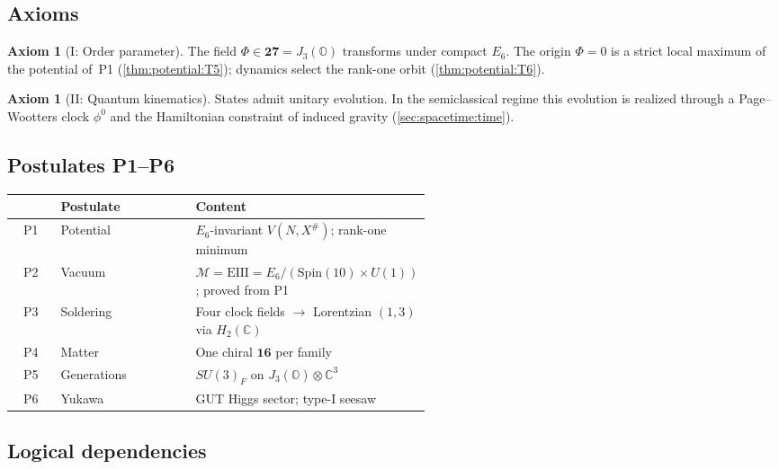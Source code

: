 \documentclass[11pt]{article}
\theoremstyle{plain}
\theoremstyle{definition}
\newtheorem{axiom}[theorem]{Axiom}
\theoremstyle{remark}
\newcommand{\clock}{\phi^{0}}
\begin{document}
\subsection{Axioms}
\label{sec:master:axioms}

\begin{axiom}[I: Order parameter]\label{ax:master:I}
The field $\Phi\in\mathbf{27}=J_3(\mathbb O)$ transforms under compact $E_6$.
The origin $\Phi=0$ is a strict local maximum of the potential of~\textnormal{P1}
(\autoref{thm:potential:T5}); dynamics select the rank-one orbit
(\autoref{thm:potential:T6}).
\end{axiom}

\begin{axiom}[II: Quantum kinematics]\label{ax:master:II}
States admit unitary evolution. In the semiclassical regime this evolution is
realized through a Page--Wootters clock $\clock$ and the Hamiltonian constraint
of induced gravity (\autoref{sec:spacetime:time}).
\end{axiom}

\subsection{Postulates \textnormal{P1--P6}}
\label{sec:master:postulates}

\begin{center}
\small
\begin{tabular}{@{}clp{0.54\linewidth}@{}}
\toprule
 & Postulate & Content \\
\midrule
P1 & Potential & $E_6$-invariant $V(N,X^\#)$; rank-one minimum \\
P2 & Vacuum & $\mathcal M=\mathrm{EIII}=E_6/(\mathrm{Spin}(10)\times U(1))$;
proved from P1 \\
P3 & Soldering & Four clock fields $\to$ Lorentzian $(1,3)$ via $H_2(\mathbb C)$ \\
P4 & Matter & One chiral $\mathbf{16}$ per family \\
P5 & Generations & $SU(3)_F$ on $J_3(\mathbb O)\otimes\mathbb C^3$ \\
P6 & Yukawa & GUT Higgs sector; type-I seesaw \\
\bottomrule
\end{tabular}
\end{center}

\subsection{Logical dependencies}
\label{sec:master:map}
\end{document}
